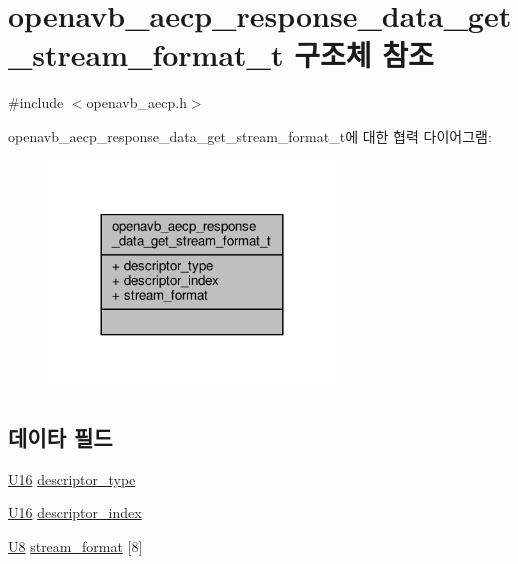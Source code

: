 \hypertarget{structopenavb__aecp__response__data__get__stream__format__t}{}\section{openavb\+\_\+aecp\+\_\+response\+\_\+data\+\_\+get\+\_\+stream\+\_\+format\+\_\+t 구조체 참조}
\label{structopenavb__aecp__response__data__get__stream__format__t}


{\ttfamily \#include $<$openavb\+\_\+aecp.\+h$>$}



openavb\+\_\+aecp\+\_\+response\+\_\+data\+\_\+get\+\_\+stream\+\_\+format\+\_\+t에 대한 협력 다이어그램\+:
\nopagebreak
\begin{figure}[H]
\begin{center}
\leavevmode
\includegraphics[width=216pt]{structopenavb__aecp__response__data__get__stream__format__t__coll__graph}
\end{center}
\end{figure}
\subsection*{데이타 필드}
\begin{DoxyCompactItemize}
\item 
\hyperlink{openavb__types__base__pub_8h_a0a0a322d5fa4a546d293a77ba8b4a71f}{U16} \hyperlink{structopenavb__aecp__response__data__get__stream__format__t_a1e231d7874aada5925b29affc76782cc}{descriptor\+\_\+type}
\item 
\hyperlink{openavb__types__base__pub_8h_a0a0a322d5fa4a546d293a77ba8b4a71f}{U16} \hyperlink{structopenavb__aecp__response__data__get__stream__format__t_ab26fb363c24b9a2a4391f9171c981b08}{descriptor\+\_\+index}
\item 
\hyperlink{openavb__types__base__pub_8h_aa63ef7b996d5487ce35a5a66601f3e73}{U8} \hyperlink{structopenavb__aecp__response__data__get__stream__format__t_a574c1a5d46fe953da8f394d622e1da8e}{stream\+\_\+format} \mbox{[}8\mbox{]}
\end{DoxyCompactItemize}


